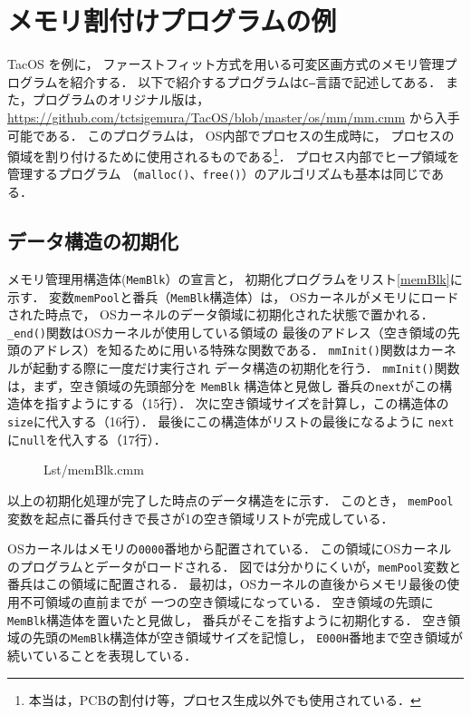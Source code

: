 \chapter{メモリ割付けプログラムの例}
TacOS を例に，
ファーストフィット方式を用いる可変区画方式のメモリ管理プログラムを紹介する．
以下で紹介するプログラムは{\tt C--}言語で記述してある．
また，プログラムのオリジナル版は，
\url{https://github.com/tctsigemura/TacOS/blob/master/os/mm/mm.cmm}
から入手可能である．
このプログラムは，
OS内部でプロセスの生成時に，
プロセスの領域を割り付けるために使用されるものである\footnote{
本当は，PCBの割付け等，プロセス生成以外でも使用されている．}．
プロセス内部でヒープ領域を管理するプログラム
（{\tt malloc()}、{\tt free()}）のアルゴリズムも基本は同じである．

\section{データ構造の初期化}
メモリ管理用構造体({\tt MemBlk}）の宣言と，
初期化プログラムをリスト\ref{memBlk}に示す．
変数{\tt memPool}と番兵（{\tt MemBlk}構造体）は，
OSカーネルがメモリにロードされた時点で，
OSカーネルのデータ領域に初期化された状態で置かれる．
{\tt \_end()}関数はOSカーネルが使用している領域の
最後のアドレス（空き領域の先頭のアドレス）を知るために用いる特殊な関数である．
{\tt mmInit()}関数はカーネルが起動する際に一度だけ実行され
データ構造の初期化を行う．
{\tt mmInit()}関数は，まず，空き領域の先頭部分を {\tt MemBlk} 構造体と見做し
番兵の{\tt next}がこの構造体を指すようにする（15行）．
次に空き領域サイズを計算し，この構造体の{\tt size}に代入する（16行）．
最後にこの構造体がリストの最後になるように
{\tt next}に{\tt null}を代入する（17行）．

\begin{figure}[btph]

{Lst/memBlk.cmm}
\end{figure}

以上の初期化処理が完了した時点のデータ構造をに示す．
このとき，
{\tt memPool}変数を起点に番兵付きで長さが1の空き領域リストが完成している．

OSカーネルはメモリの{\tt 0000}番地から配置されている．
この領域にOSカーネルのプログラムとデータがロードされる．
図では分かりにくいが，{\tt memPool}変数と番兵はこの領域に配置される．
最初は，OSカーネルの直後からメモリ最後の使用不可領域の直前までが
一つの空き領域になっている．
空き領域の先頭に{\tt MemBlk}構造体を置いたと見做し，
番兵がそこを指すように初期化する．
空き領域の先頭の{\tt MemBlk}構造体が空き領域サイズを記憶し，
{\tt E000H}番地まで空き領域が続いていることを表現している．

